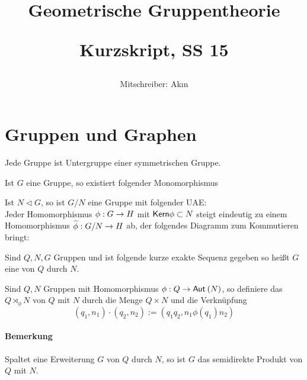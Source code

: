 \documentclass{article}
\newcommand{\normal}{\vartriangleleft}
\newcommand{\tm}{\subset}
\begin{document}
\title{
	\begin{huge}
		Geometrische Gruppentheorie\\
	\end{huge}
	\begin{large}
		Kurzskript, SS 15
\end{large}}


\author{Mitschreiber: Ak\i n}
\maketitle
\renewcommand{\i}{^{-1}}


\setcounter{tocdepth}{1}
\tableofcontents

\newpage
\section{Gruppen und Graphen}
Jede Gruppe ist Untergruppe einer symmetrischen Gruppe.
\begin{Beweis}{}
Ist $G$ eine Gruppe, so existiert folgender Monomorphismus
\end{Beweis}
Ist $N\normal G $, so ist $G/N$ eine Gruppe mit folgender UAE:\\
Jeder Homomorphismus $\phi : G \overset{}{\rightarrow} H$ mit $\Ker \phi \tm N $ steigt eindeutig zu einem Homomorphismus $\widetilde{\phi} : G/N \overset{}{\rightarrow} H$ ab, der folgendes Diagramm zum Kommutieren bringt:
\begin{center}
\end{center}

Sind $Q,N,G$ Gruppen und ist folgende kurze exakte Sequenz gegeben
so heißt $G$ eine  von $Q$ durch $N$.

Sind $Q,N$ Gruppen mit Homomorphismus $\phi : Q \overset{}{\rightarrow} \textsf{Aut}_{}\left(N\right)$, so definiere das  $Q\rtimes_\phi N$ von $Q$ mit $N$ durch die Menge $Q\times N$ und die Verknüpfung
\[ (q_1,n_1) \cdot (q_2, n_2) := (q_1q_2, n_1 \phi(q_1) n_2 ) \]
\paragraph{Bemerkung}
Spaltet eine Erweiterung $G$ von $Q$ durch $N$, so ist $G$ das semidirekte Produkt von $Q$ mit $N$.
\end{document}
